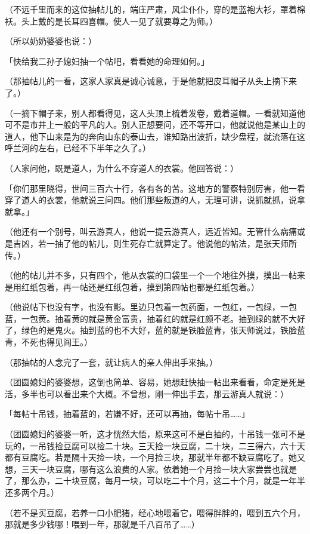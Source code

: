 \documentclass[UTF8]{ctexart}
\begin{document}
（不远千里而来的这位抽帖儿的，端庄严肃，风尘仆仆，穿的是蓝袍大衫，罩着棉袄。头上戴的是长耳四喜帽。使人一见了就要尊之为师。）

（所以奶奶婆婆也说：）

「快给我二孙子媳妇抽一个帖吧，看看她的命理如何。」

（那抽帖儿的一看，这家人家真是诚心诚意，于是他就把皮耳帽子从头上摘下来了。）

（一摘下帽子来，别人都看得见，这人头顶上梳着发卷，戴着道帽。一看就知道他可不是市井上一般的平凡的人。别人正想要问，还不等开口，他就说他是某山上的道人，他下山来是为的奔向山东的泰山去，谁知路出波折，缺少盘程，就流落在这呼兰河的左右，已经不下半年之久了。）

（人家问他，既是道人，为什么不穿道人的衣裳。他回答说：）

「你们那里晓得，世间三百六十行，各有各的苦。这地方的警察特别厉害，他一看穿了道人的衣裳，他就说三问四。他们那些叛道的人，无理可讲，说抓就抓，说拿就拿。」

（他还有一个别号，叫云游真人，他说一提云游真人，远近皆知。无管什么病痛或是吉凶，若一抽了他的帖儿，则生死存亡就算定了。他说他的帖法，是张天师所传。）

（他的帖儿并不多，只有四个，他从衣裳的口袋里一个一个地往外摸，摸出一帖来是用红纸包着，再一帖还是红纸包着，摸到第四帖也都是红纸包着。）

（他说帖下也没有字，也没有影。里边只包着一包药面，一包红，一包绿，一包蓝，一包黄。抽着黄的就是黄金富贵，抽着红的就是红颜不老。抽到绿的就不大好了，绿色的是鬼火。抽到蓝的也不大好，蓝的就是铁脸蓝青，张天师说过，铁脸蓝青，不死也得见阎王。）

（那抽帖的人念完了一套，就让病人的亲人伸出手来抽。）

（团圆媳妇的婆婆想，这倒也简单、容易，她想赶快抽一帖出来看看，命定是死是活，多半也可以看出来个大概。不曾想，刚一伸出手去，那云游真人就说：）

「每帖十吊钱，抽着蓝的，若嫌不好，还可以再抽，每帖十吊……」

（团圆媳妇的婆婆一听，这才恍然大悟，原来这可不是白抽的，十吊钱一张可不是玩的，一吊钱捡豆腐可以捡二十块。三天捡一块豆腐，二十块，二三得六，六十天都有豆腐吃。若是隔十天捡一块，一个月捡三块，那就半年都不缺豆腐吃了。她又想，三天一块豆腐，哪有这么浪费的人家。依着她一个月捡一块大家尝尝也就是了，那么办，二十块豆腐，每月一块，可以吃二十个月，这二十个月，就是一年半还多两个月。）

（若不是买豆腐，若养一口小肥猪，经心地喂着它，喂得胖胖的，喂到五六个月，那就是多少钱哪！喂到一年，那就是千八百吊了……）
\end{document}
